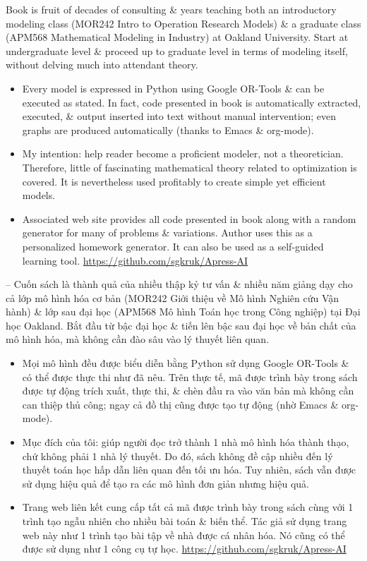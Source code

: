 \documentclass{article}
\begin{document}
\begin{itemize}
\begin{itemize}
        Book is fruit of decades of consulting \& years teaching both an introductory modeling class (MOR242 Intro to Operation Research Models) \& a graduate class (APM568 Mathematical Modeling in Industry) at Oakland University. Start at undergraduate level \& proceed up to graduate level in terms of modeling itself, without delving much into attendant theory.
        \begin{itemize}
            \item Every model is expressed in Python using Google OR-Tools \& can be executed as stated. In fact, code presented in book is automatically extracted, executed, \& output inserted into text without manual intervention; even graphs are produced automatically (thanks to Emacs \& org-mode).
            \item My intention: help reader become a proficient modeler, not a theoretician. Therefore, little of fascinating mathematical theory related to optimization is covered. It is nevertheless used profitably to create simple yet efficient models.
            \item Associated web site provides all code presented in book along with a random generator for many of problems \& variations. Author uses this as a personalized homework generator. It can also be used as a self-guided learning tool. \url{https://github.com/sgkruk/Apress-AI}
        \end{itemize}
        -- Cuốn sách là thành quả của nhiều thập kỷ tư vấn \& nhiều năm giảng dạy cho cả lớp mô hình hóa cơ bản (MOR242 Giới thiệu về Mô hình Nghiên cứu Vận hành) \& lớp sau đại học (APM568 Mô hình Toán học trong Công nghiệp) tại Đại học Oakland. Bắt đầu từ bậc đại học \& tiến lên bậc sau đại học về bản chất của mô hình hóa, mà không cần đào sâu vào lý thuyết liên quan.
        \begin{itemize}
            \item Mọi mô hình đều được biểu diễn bằng Python sử dụng Google OR-Tools \& có thể được thực thi như đã nêu. Trên thực tế, mã được trình bày trong sách được tự động trích xuất, thực thi, \& chèn đầu ra vào văn bản mà không cần can thiệp thủ công; ngay cả đồ thị cũng được tạo tự động (nhờ Emacs \& org-mode).
            \item Mục đích của tôi: giúp người đọc trở thành 1 nhà mô hình hóa thành thạo, chứ không phải 1 nhà lý thuyết. Do đó, sách không đề cập nhiều đến lý thuyết toán học hấp dẫn liên quan đến tối ưu hóa. Tuy nhiên, sách vẫn được sử dụng hiệu quả để tạo ra các mô hình đơn giản nhưng hiệu quả.
            \item Trang web liên kết cung cấp tất cả mã được trình bày trong sách cùng với 1 trình tạo ngẫu nhiên cho nhiều bài toán \& biến thể. Tác giả sử dụng trang web này như 1 trình tạo bài tập về nhà được cá nhân hóa. Nó cũng có thể được sử dụng như 1 công cụ tự học. \url{https://github.com/sgkruk/Apress-AI}

\end{itemize}
\end{itemize}
\end{itemize}
\end{document}
